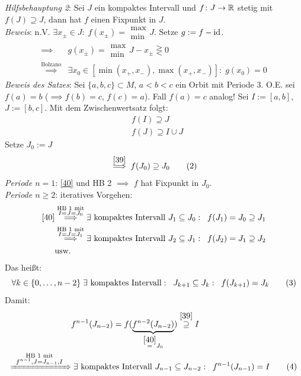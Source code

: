 \documentclass[a4paper]{article}
\begin{document}
\begin{Beweis}
\textit{Hilfsbehauptung 2}: Sei $J$ ein kompaktes Intervall und $f\colon J\to\mathbb R$ stetig mit $f(J)\supseteq J$, dann hat $f$ einen Fixpunkt in $J$.\\
\textit{Beweis}: n.V. $\exists x_{\pm}\in J:\;f(x_{\pm})= \begin{array}{l}
\max\\\min
\end{array} J$. Setze $g:=f-\operatorname{\mathrm{id}}$.
\begin{align*}
\implies& g(x_{\pm})=\begin{array}{l}
\max\\\min
\end{array}J-x_{\pm}
\gtreqless 0\\
\overset{\text{Bolzano}}{\implies}&\exists x_0\in[\min(x_+,x_-),\max(x_+,x_-)]:\; g(x_0)=0
\end{align*}
\textit{Beweis des Satzes}:
Sei $\{a,b,c\}\subset M$, $a<b<c$ ein Orbit mit Periode 3. O.E. sei $f(a)=b$ ($\implies f(b)=c,\,f(c)=a$). Fall $f(a)=c$ analog! Sei $I:=[a,b]$, $J:=[b,c]$. Mit dem Zwischenwertsatz folgt:
\begin{align*}
&f(I)\supseteq J\tag{$0$}\label{38}\\
&f(J)\supseteq I\cup J\tag{$1$}\label{39}
\end{align*}
Setze $J_0:=J$
\[\overset{\eqref{39}}{\implies} f(J_0)\supseteq J_0\tag{2}\label{40}\]
\textit{Periode $n=1$}: \eqref{40} und HB 2 $\implies$ $f$ hat Fixpunkt in $J_0$.\\
\textit{Periode $n\ge2$}: iteratives Vorgehen: 
\begin{align*}
\eqref{40}&\overset{\substack{\text{HB 1 mit}\\ I=J=J_0}}{\implies}\exists\text{ kompaktes Intervall }J_1\subseteq J_0:\;\;f(J_1)=J_0\supseteq J_1\\
&\overset{\substack{\text{HB 1 mit}\\ I=J=J_1}}{\implies}
\exists\text{ kompaktes Intervall }J_2\subseteq J_1:\;\;f(J_2)=J_1\supseteq J_2\\
&\text{usw.}
\end{align*}
Das heißt:
\[\forall k\in\{0,\ldots,n-2\}\;\exists\text{ kompaktes Intervall}:\;\;J_{k+1}\subseteq J_k:\;\;f(J_{k+1})=J_k\tag{$3$}\label{41}
\]
Damit:
\begin{align*}
&f^{n-1}(J_{n-2})=f(\underbrace{f^{n-2}(J_{n-2})}_{\overset{\eqref{40}}{=}J_0})\overset{\eqref{39}}{\supseteq} I\\
\xRightarrow[\hspace{2.3cm}]{\substack{\text{HB 1 mit}\\ f^{n-1}, J=J_{n-1},I}}&\; \exists\te{kompaktes Intervall }J_{n-1}\subseteq J_{n-2}:\;\; f^{n-1}(J_{n-1})=I\tag{$4$}\label{42}\\

\end{align*}
\end{Beweis}
\end{document}
